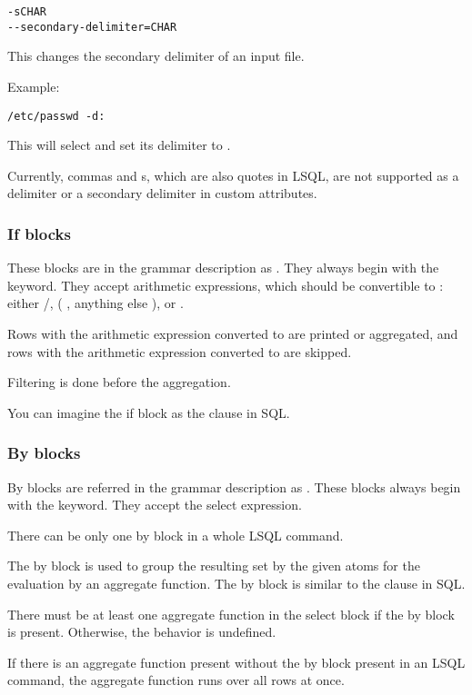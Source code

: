\begin{verbatim}
-sCHAR
--secondary-delimiter=CHAR
\end{verbatim}
This changes the secondary delimiter of an input file.

Example:
\begin{verbatim}
/etc/passwd -d:
\end{verbatim}
This will select  and set its delimiter to \icode{:}.

Currently, commas and s, which are also quotes in LSQL, are not supported as a delimiter or a secondary delimiter in  custom attributes.

\subsubsection{If blocks}
These blocks are in the grammar description as .
They always begin with the  keyword. 
They accept arithmetic expressions, which should be convertible to : 
either  /,  ( , anything else ), or . 

Rows with the arithmetic expression converted to   are printed or aggregated, and 
rows with the arithmetic expression converted to   are skipped.

Filtering is done before the aggregation.

You can imagine the if block as the  clause in SQL.

\subsubsection{By blocks}
By blocks are referred in the grammar description as .
These blocks always begin with the  keyword. They accept the select expression. 

There can be only one by block in a whole LSQL command.

The by block is used to group the resulting set by the given atoms for the evaluation by an aggregate function.
The by block is similar to the  clause in SQL. 

There must be at least one aggregate function in the select block if the by block is present. Otherwise, the behavior is undefined.

If there is an aggregate function present without the by block present in an LSQL command, the aggregate function runs over all rows at once.

